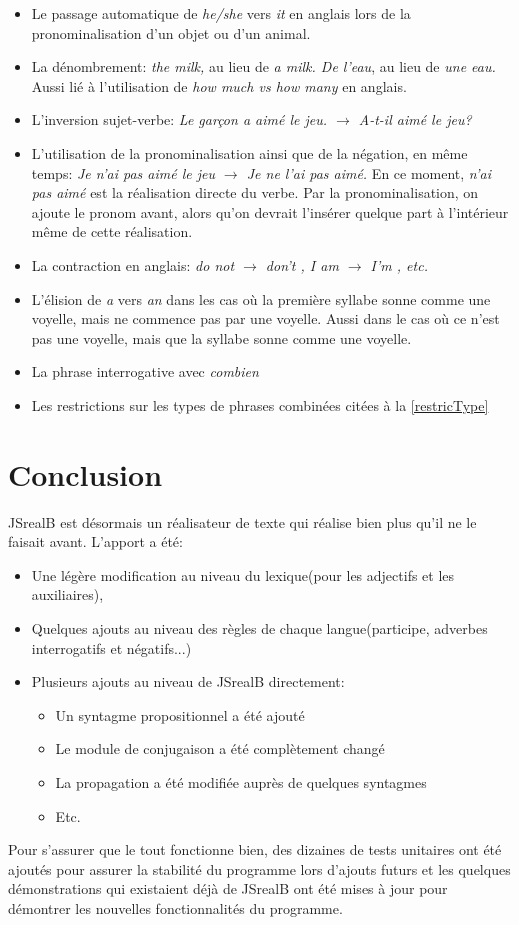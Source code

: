 \documentclass[11pt]{article} %
\newcommand{\system}[1]{\textsf{#1}}
\newcommand{\JSB}{\system{JSrealB}}
\begin{document}
\begin{itemize}
\item Le passage automatique de \emph{he/she} vers \emph{it} en anglais
lors de la pronominalisation d'un objet ou d'un animal.
\item La dénombrement: \emph{the milk, }au lieu de \emph{a milk. De l'eau},
au lieu de \emph{une eau. }Aussi lié à l'utilisation de \emph{how much
vs how many }en anglais.
\item L'inversion sujet-verbe: \emph{Le garçon a aimé le jeu. $\rightarrow$ A-t-il
aimé le jeu?}
\item L'utilisation de la pronominalisation ainsi que de la négation, en
même temps: \emph{Je n'ai pas aimé le jeu $\rightarrow$ Je ne l'ai pas aimé.
}En ce moment, \emph{n'ai pas aimé} est la réalisation directe du
verbe. Par la pronominalisation, on ajoute le pronom avant, alors
qu'on devrait l'insérer quelque part à l'intérieur même de cette réalisation.
\item La contraction en anglais: \emph{do not $\rightarrow$ don't , I am $\rightarrow$ I'm , etc.}
\item L'élision de \emph{a} vers \emph{an} dans les cas où la première syllabe sonne comme une voyelle,
mais ne commence pas par une voyelle. Aussi dans le cas où ce n'est pas une voyelle, mais que la syllabe
sonne comme une voyelle.
\item La phrase interrogative avec \emph{combien}
\item Les restrictions sur les types de phrases combinées citées à la \autoref{restricType}
\end{itemize}

\section{Conclusion}
\JSB{} est désormais un réalisateur de texte qui réalise bien plus
qu'il ne le faisait avant. L'apport a été:
\begin{itemize}
\item Une légère
modification au niveau du lexique(pour les adjectifs et les auxiliaires),
\item Quelques ajouts au niveau des règles de chaque langue(participe, adverbes
interrogatifs et négatifs...)
\item Plusieurs ajouts au niveau de \JSB{}
directement:
\begin{itemize} 
\item Un syntagme propositionnel a été ajouté
\item Le module de conjugaison a été complètement changé
\item La propagation a été modifiée auprès de quelques syntagmes
\item Etc. 
\end{itemize}
\end{itemize}
Pour s'assurer que le
tout fonctionne bien, des dizaines de tests unitaires ont été ajoutés pour assurer
la stabilité du programme lors d'ajouts futurs et les quelques démonstrations
qui existaient déjà de \JSB{} ont été mises à jour pour démontrer
les nouvelles fonctionnalités du programme.



\end{document}
